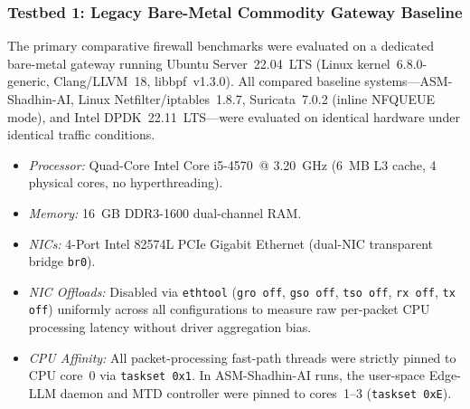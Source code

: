 \documentclass[journal]{IEEEtran}
\renewcommand{\_}{\textunderscore\allowbreak}
\begin{document}
\subsubsection{Testbed 1: Legacy Bare-Metal Commodity Gateway Baseline}
The primary comparative firewall benchmarks were evaluated on a dedicated bare-metal gateway running Ubuntu Server~22.04~LTS (Linux kernel~6.8.0-generic, Clang/LLVM~18, libbpf~v1.3.0). All compared baseline systems---ASM-Shadhin-AI, Linux Netfilter/iptables~1.8.7, Suricata~7.0.2 (inline NFQUEUE mode), and Intel DPDK~22.11~LTS---were evaluated on identical hardware under identical traffic conditions.
\begin{itemize}
  \item \textit{Processor:} Quad-Core Intel Core i5-4570~@ 3.20~GHz (6~MB L3 cache, 4 physical cores, no hyperthreading).
  \item \textit{Memory:} 16~GB DDR3-1600 dual-channel RAM.
  \item \textit{NICs:} 4-Port Intel 82574L PCIe Gigabit Ethernet (dual-NIC transparent bridge \texttt{br0}).
  \item \textit{NIC Offloads:} Disabled via \texttt{ethtool} (\texttt{gro off}, \texttt{gso off}, \texttt{tso off}, \texttt{rx off}, \texttt{tx off}) uniformly across all configurations to measure raw per-packet CPU processing latency without driver aggregation bias.
  \item \textit{CPU Affinity:} All packet-processing fast-path threads were strictly pinned to CPU core~0 via \texttt{taskset~0x1}. In ASM-Shadhin-AI runs, the user-space Edge-LLM daemon and MTD controller were pinned to cores~1--3 (\texttt{taskset~0xE}).
\end{itemize}
\end{document}
